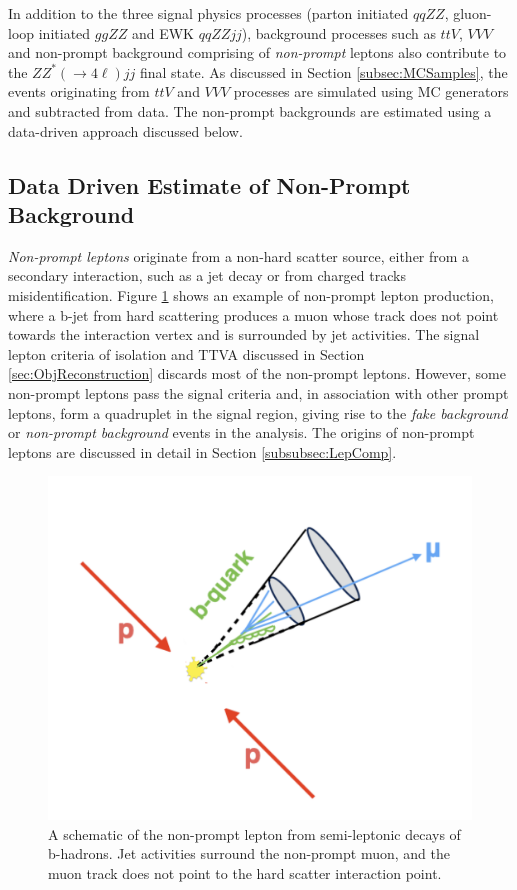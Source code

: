 In addition to the three signal physics processes (parton initiated $qqZZ$, gluon-loop initiated $ggZZ$ and EWK $qqZZjj$), background processes such as $ttV$, $VVV$ and non-prompt background comprising of \textit{non-prompt} leptons also contribute to the $ZZ^*(\rightarrow 4\ell) jj$ final state. As discussed in Section \ref{subsec:MCSamples}, the events originating from $ttV$ and $VVV$ processes are simulated using MC generators and subtracted from data. The non-prompt backgrounds are estimated using a data-driven approach discussed below. 

\subsection{Data Driven Estimate of Non-Prompt Background}
\label{subsec:FakeBackground}

\textit{Non-prompt leptons} originate from a non-hard scatter source, either from a secondary interaction, such as a jet decay or from charged tracks misidentification. Figure \ref{fig:NonPromptLepton} shows an example of non-prompt lepton production, where a b-jet from hard scattering produces a muon whose track does not point towards the interaction vertex and is surrounded by jet activities. The signal lepton criteria of isolation and TTVA discussed in Section \ref{sec:ObjReconstruction} discards most of the non-prompt leptons. However, some non-prompt leptons pass the signal criteria and, in association with other prompt leptons, form a quadruplet in the signal region, giving rise to the \textit{fake background} or \textit{non-prompt background} events in the analysis. The origins of non-prompt leptons are discussed in detail in Section \ref{subsubsec:LepComp}.

\begin{figure}[!htbp]
    \centering
    \includegraphics[width=.7\linewidth]{figures/Analysis/Background/NonPromptLeptonExample.png}  
    \caption{A schematic of the non-prompt lepton from semi-leptonic decays of b-hadrons. Jet activities surround the non-prompt muon, and the muon track does not point to the hard scatter interaction point.\label{fig:NonPromptLepton}}
\end{figure}

